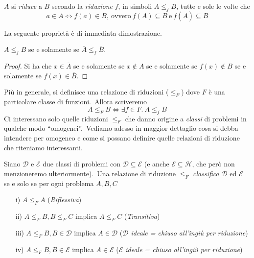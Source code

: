 \begin{definition}
    \label{riduzione}
    $A$ si \textit{riduce} a $B$ secondo la \textit{riduzione} $f$, in simboli $A \leqslant_f B$, tutte e sole le volte che
    \[a \in A \Leftrightarrow f(a) \in B,\ \mathrm{ovvero}\ f(A) \subseteq B\ \mathrm{e}\ f(\bar{A}) \subseteq \overline{B}\]
\end{definition}

\noindent La seguente proprietà è di immediata dimostrazione.

\begin{property}
    \label{riduzione_prop}
    $A \leqslant_f B$ se e solamente se $\bar{A} \leqslant_f \overline{B}$.
\end{property}

\begin{proof}
    Si ha che $x \in \bar{A}$ se e solamente se $x \notin A$ se e solamente se $f(x) \notin B$ se e solamente se $f(x) \in \overline{B}$.
\end{proof}

\noindent Più in generale, si definisce una relazione di riduzioni ($\leqslant_F$) dove $F$ è una particolare classe di funzioni.\
Allora scriveremo
\[A \leqslant_F B \Leftrightarrow \exists f \in F.\ A\leqslant_f B\]
Ci interessano solo quelle riduzioni $\leqslant_F$ che danno origine a \textit{classi} di problemi in qualche modo ``omogenei''.\
Vediamo adesso in maggior dettaglio cosa si debba intendere per omogeneo e come si possano definire quelle relazioni di riduzione che riteniamo interessanti.\

\begin{definition}
    \label{classificazione}
    Siano $\mathcal{D}$ e $\mathcal{E}$ due classi di problemi con $\mathcal{D} \subseteq \mathcal{E}$ (e anche $\mathcal{E} \subseteq \mathcal{H}$, che però non menzioneremo ulteriormente).\
    Una relazione di riduzione $\leqslant_F$ \textit{classifica} $\mathcal{D}$ ed $\mathcal{E}$ se e solo se per ogni problema $A,B,C$

    \begin{itemize}
        \item[i)] $A \leqslant_F A$ \hfill (\textit{\footnotesize Riflessiva})
        \item[ii)] $A \leqslant_F B, B \leqslant_F C$ implica $A \leqslant_F C$ \hfill (\textit{\footnotesize Transitiva})
        \item[iii)] $A \leqslant_F B, B \in \mathcal{D}$ implica $A \in \mathcal{D}$ \hfill (\textit{\footnotesize $\mathcal{D}$ ideale = chiuso all'ingiù per riduzione})
        \item[iv)] $A \leqslant_F B, B \in \mathcal{E}$ implica $A \in \mathcal{E}$ \hfill (\textit{\footnotesize $\mathcal{E}$ ideale = chiuso all'ingiù per riduzione})
    \end{itemize}
\end{definition}

